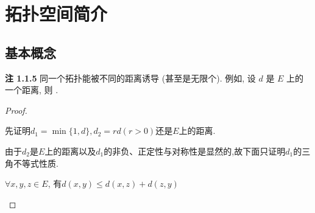 \chapter{拓扑空间简介}
    \section{基本概念}
    \begin{detail}{2}{
        \textbf{注 1.1.5} 同一个拓扑能被不同的距离诱导 (甚至是无限个). 例如, 设 $d$ 是 $E$ 上的一个距离, 则 . 
    }
        \begin{proof}
            \begin{step}
                \item 先证明$d_1=\min \{1,d\}, d_2=rd(r>0)$还是$E$上的距离. 
                        
                由于$d_2$是$E$上的距离以及$d_1$的非负、正定性与对称性是显然的,故下面只证明$d_1$的三角不等式性质.
                        
                $\forall x,y,z\in E$, 有$d(x,y)\leqslant d(x,z)+d(z,y)$
            \end{step}
        \end{proof}
    \end{detail}
